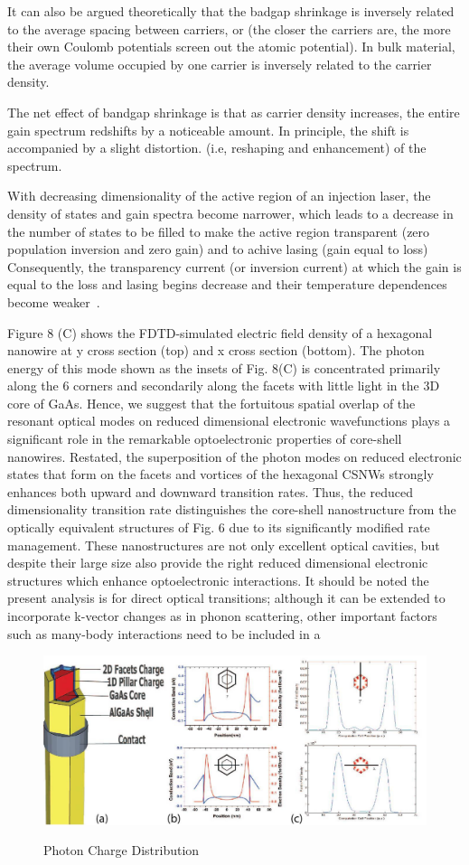 It can also be argued theoretically that the badgap shrinkage is inversely
related to the average spacing between carriers, or (the closer the carriers
are, the more their own Coulomb potentials screen out the atomic potential). In
bulk material, the average volume occupied by one carrier is inversely related
to the carrier density. 

The net effect of bandgap shrinkage is that as carrier density increases, the
entire gain spectrum redshifts by a noticeable amount. In principle, the shift
is accompanied by a slight distortion. (i.e, reshaping and enhancement) of the
spectrum.

With decreasing dimensionality of the active region of an injection laser, the
density of states and gain spectra become narrower, which leads to a decrease
in the number of states to be filled to make the active region transparent
(zero population inversion and zero gain) and to achive lasing (gain equal to
loss) Consequently, the transparency current (or inversion current) at which
the gain is equal to the loss and lasing begins decrease and their temperature
dependences become weaker~\cite{asryan2004theory}.

Figure 8 (C) shows the FDTD-simulated electric field density of a hexagonal
nanowire at y cross section (top) and x cross section (bottom). The photon
energy of this mode shown as the insets of Fig. 8(C) is concentrated primarily
along the 6 corners and secondarily along the facets with little light in the
3D core of GaAs. Hence, we suggest that the fortuitous spatial overlap of the
resonant optical modes on reduced dimensional electronic wavefunctions plays a
significant role in the remarkable optoelectronic properties of core-shell
nanowires. Restated, the superposition of the photon modes  on reduced
electronic states that form on the facets and vortices of the hexagonal CSNWs
strongly enhances both upward and downward transition rates.  Thus, the reduced
dimensionality transition rate distinguishes the core-shell nanostructure from
the optically equivalent structures of Fig. 6 due to its significantly modified
rate management. These nanostructures are not only excellent optical cavities,
but despite their large size also provide the right reduced dimensional
electronic structures which enhance optoelectronic interactions.  It should be
noted the present analysis is for direct optical transitions; although it can
be extended to incorporate k-vector changes as in phonon scattering, other
important factors such as many-body interactions need to be included in a


\begin{figure}
  \caption{Photon Charge Distribution}
  \centering
  \includegraphics[width=\textwidth]{pictures/ED/Photoncharge}
  \label{PhotonCharge}
\end{figure}



